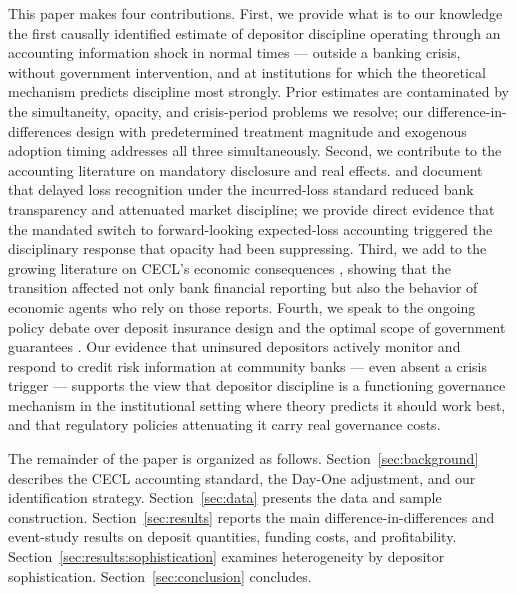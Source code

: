 This paper makes four contributions. First, we provide what is to our knowledge
the first causally identified estimate of depositor discipline operating through
an accounting information shock in normal times --- outside a banking crisis,
without government intervention, and at institutions for which the theoretical
mechanism predicts discipline most strongly. Prior estimates are contaminated by
the simultaneity, opacity, and crisis-period problems we resolve; our
difference-in-differences design with predetermined treatment magnitude and
exogenous adoption timing addresses all three simultaneously. Second, we
contribute to the accounting literature on mandatory disclosure and real effects.
\citet{bushman2012accounting} and \citet{bushman2015delayed} document that
delayed loss recognition under the incurred-loss standard reduced bank
transparency and attenuated market discipline; we provide direct evidence that
the mandated switch to forward-looking expected-loss accounting triggered the
disciplinary response that opacity had been suppressing. Third, we add to the
growing literature on CECL's economic consequences
\citep{kim2026current,gee2022decision,nicoletti2018bank}, showing that the
transition affected not only bank financial reporting but also the behavior of
economic agents who rely on those reports. Fourth, we speak to the ongoing policy
debate over deposit insurance design and the optimal scope of government
guarantees \citep{calomiris2013political,demirguc2002does}. Our evidence that
uninsured depositors actively monitor and respond to credit risk information at
community banks --- even absent a crisis trigger --- supports the view that
depositor discipline is a functioning governance mechanism in the institutional
setting where theory predicts it should work best, and that regulatory policies
attenuating it carry real governance costs.

The remainder of the paper is organized as follows.
Section~\ref{sec:background} describes the CECL accounting standard, the
Day-One adjustment, and our identification strategy.
Section~\ref{sec:data} presents the data and sample construction.
Section~\ref{sec:results} reports the main difference-in-differences and
event-study results on deposit quantities, funding costs, and profitability.
Section~\ref{sec:results:sophistication} examines heterogeneity by depositor
sophistication. Section~\ref{sec:conclusion} concludes.



